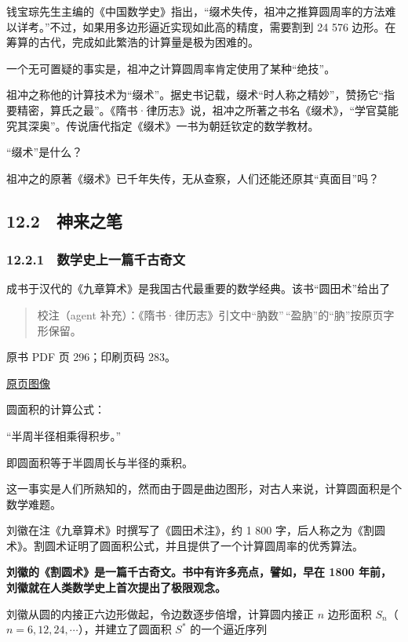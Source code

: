 钱宝琮先生主编的《中国数学史》指出，``缀术失传，祖冲之推算圆周率的方法难以详考。''不过，如果用多边形逼近实现如此高的精度，需要割到 24 576 边形。在筹算的古代，完成如此繁浩的计算量是极为困难的。

一个无可置疑的事实是，祖冲之计算圆周率肯定使用了某种``绝技''。

祖冲之称他的计算技术为``缀术''。据史书记载，缀术``时人称之精妙''，赞扬它``指要精密，算氏之最''。《隋书·律历志》说，祖冲之所著之书名《缀术》，``学官莫能究其深奥''。传说唐代指定《缀术》一书为朝廷钦定的数学教材。

``缀术''是什么？

祖冲之的原著《缀术》已千年失传，无从查察，人们还能还原其``真面目''吗？

\subsection{12.2　神来之笔}\label{ch12-ux795eux6765ux4e4bux7b14}

\subsubsection{12.2.1　数学史上一篇千古奇文}\label{ch12-ux6570ux5b66ux53f2ux4e0aux4e00ux7bc7ux5343ux53e4ux5947ux6587}

成书于汉代的《九章算术》是我国古代最重要的数学经典。该书``圆田术''给出了

\begin{quote}
校注（agent 补充）：《隋书·律历志》引文中``肭数''\,``盈肭''的``肭''按原页字形保留。
\end{quote}

\clearpage

原书 PDF 页 296；印刷页码 283。

\href{source-images/pdf-296.jpeg}{原页图像}

圆面积的计算公式：

``半周半径相乘得积步。''

即圆面积等于半圆周长与半径的乘积。

这一事实是人们所熟知的，然而由于圆是曲边图形，对古人来说，计算圆面积是个数学难题。

刘徽在注《九章算术》时撰写了《圆田术注》，约 1 800 字，后人称之为《割圆术》。割圆术证明了圆面积公式，并且提供了一个计算圆周率的优秀算法。

\textbf{刘徽的《割圆术》是一篇千古奇文。书中有许多亮点，譬如，早在 1800 年前，刘徽就在人类数学史上首次提出了极限观念。}

刘徽从圆的内接正六边形做起，令边数逐步倍增，计算圆内接正 \(n\) 边形面积 \(S_n\)（\(n=6,12,24,\cdots\)），并建立了圆面积 \(S^*\) 的一个逼近序列

